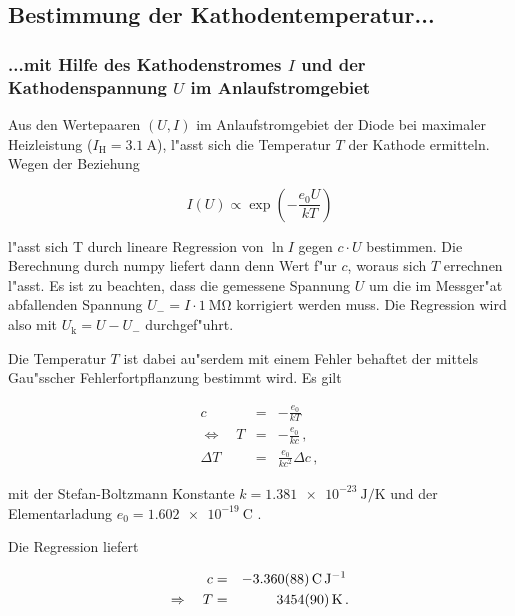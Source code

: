 		\enlargethispage{10cm}

		\clearpage

	\subsection{Bestimmung der Kathodentemperatur...}
		\subsubsection{...mit Hilfe des Kathodenstromes $I$ und der Kathodenspannung $U$ im Anlaufstromgebiet}
			\label{subsubsec:temp1}
			Aus den Wertepaaren $(U,I)$ im Anlaufstromgebiet der Diode bei maximaler Heizleistung ($I_\mathrm{H} = \SI{3.1}{\ampere}$), l"asst sich die Temperatur $T$ der Kathode ermitteln.
			Wegen der Beziehung

			\begin{equation*}
				I(U) \propto \exp{\left(-\frac{e_0 U}{kT}\right)}
			\end{equation*}

			l"asst sich T durch lineare Regression von $\ln{I}$ gegen $c\cdot U$ bestimmen. Die Berechnung durch numpy liefert dann denn Wert f"ur $c$, woraus sich $T$ errechnen l"asst.
			Es ist zu beachten, dass die gemessene Spannung $U$ um die im Messger"at abfallenden Spannung $U_- = I \cdot \SI{1}{\mega \ohm}$ korrigiert werden muss.
			Die Regression wird also mit $U_\mathrm{k} = U - U_-$ durchgef"uhrt.

			Die Temperatur $T$ ist dabei au"serdem mit einem Fehler behaftet der mittels Gau"sscher Fehlerfortpflanzung bestimmt wird.
			Es gilt

			\begin{eqnarray*}
				c & = & -\frac{e_0}{kT}\,\\
				\Leftrightarrow \quad T & = & -\frac{e_0}{kc}\,,\\
				\Delta T & = & \frac{e_0}{kc^2}\Delta c\,,
			\end{eqnarray*}

			mit der Stefan-Boltzmann Konstante $k = \SI{1.381e-23}{\joule \per \kelvin}$ \cite{nist} und der Elementarladung $e_0 = \SI{1.602e-19}{\coulomb}$ \cite{nist}.

			Die Regression liefert

			\begin{eqnarray*}
				c & = & \SI{-3.360 (88)}{\coulomb \per \joule}\,\\
				\Rightarrow \quad T & = & \SI{3454 (90)}{\kelvin}\,.
			\end{eqnarray*}

